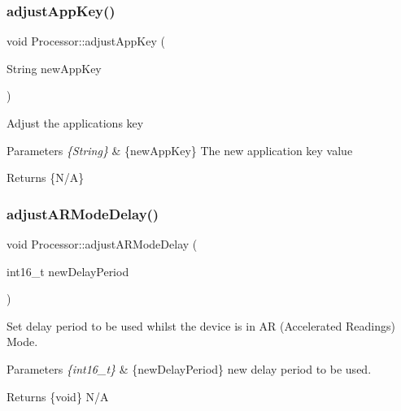 \subsubsection{\texorpdfstring{adjust\+App\+Key()}{adjustAppKey()}}
{\footnotesize\ttfamily void Processor\+::adjust\+App\+Key (\begin{DoxyParamCaption}\item[{String}]{new\+App\+Key }\end{DoxyParamCaption})}

Adjust the application\textquotesingle{}s key 
\begin{DoxyParams}{Parameters}
{\em \{\+String\}} & \{new\+App\+Key\} The new application key value \\
\hline
\end{DoxyParams}
\begin{DoxyReturn}{Returns}
\{N/A\} 
\end{DoxyReturn}
\mbox{\label{class_processor_a527c24bbc2784d267d9ff2b21fd21379}} 
\subsubsection{\texorpdfstring{adjust\+A\+R\+Mode\+Delay()}{adjustARModeDelay()}}
{\footnotesize\ttfamily void Processor\+::adjust\+A\+R\+Mode\+Delay (\begin{DoxyParamCaption}\item[{int16\+\_\+t}]{new\+Delay\+Period }\end{DoxyParamCaption})}

Set delay period to be used whilst the device is in AR (Accelerated Readings) Mode. 
\begin{DoxyParams}{Parameters}
{\em \{int16\+\_\+t\}} & \{new\+Delay\+Period\} new delay period to be used. \\
\hline
\end{DoxyParams}
\begin{DoxyReturn}{Returns}
\{void\} N/A 
\end{DoxyReturn}
\mbox{\label{class_processor_a58a2f6a482491cb003f4ff1bd45ba891}} 
